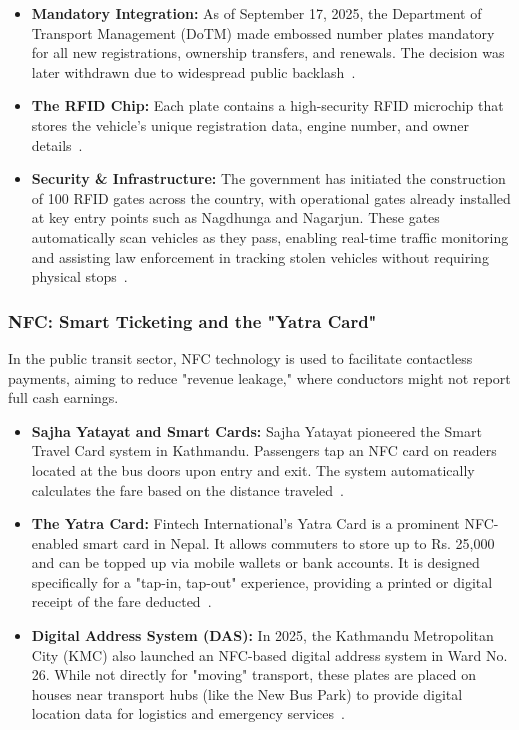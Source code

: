 \documentclass[sigconf, nonacm]{acmart}
\begin{document}
\begin{itemize}
    \item \textbf{Mandatory Integration:} As of September 17, 2025, the Department of Transport Management (DoTM) made embossed number plates mandatory for all new registrations, ownership transfers, and renewals. The decision was later withdrawn due to widespread public backlash~\cite{khatri2025embossed}.
    
    \item \textbf{The RFID Chip:} Each plate contains a high-security RFID microchip that stores the vehicle’s unique registration data, engine number, and owner details~\cite{omoda2025embossed}.
    
    \item \textbf{Security \& Infrastructure:} The government has initiated the construction of 100 RFID gates across the country, with operational gates already installed at key entry points such as Nagdhunga and Nagarjun. These gates automatically scan vehicles as they pass, enabling real-time traffic monitoring and assisting law enforcement in tracking stolen vehicles without requiring physical stops~\cite{khatri2025embossed}.
\end{itemize}


\subsubsection{NFC: Smart Ticketing and the "Yatra Card"}

In the public transit sector, NFC technology is used to facilitate contactless payments, aiming to reduce "revenue leakage," where conductors might not report full cash earnings.

\begin{itemize}
    \item \textbf{Sajha Yatayat and Smart Cards:}  Sajha Yatayat pioneered the Smart Travel Card system in Kathmandu. Passengers tap an NFC card on readers located at the bus doors upon entry and exit. The system automatically calculates the fare based on the distance traveled~\cite{shreya2025nepal}.
    
    \item \textbf{The Yatra Card:} Fintech International’s Yatra Card is a prominent NFC-enabled smart card in Nepal. It allows commuters to store up to Rs. 25,000 and can be topped up via mobile wallets or bank accounts. It is designed specifically for a "tap-in, tap-out" experience, providing a printed or digital receipt of the fare deducted~\cite{fintech2023yatra}.
    
    \item \textbf{Digital Address System (DAS):} In 2025, the Kathmandu Metropolitan City (KMC) also launched an NFC-based digital address system in Ward No. 26. While not directly for "moving" transport, these plates are placed on houses near transport hubs (like the New Bus Park) to provide digital location data for logistics and emergency services~\cite{bhatta2025kathmandu}.
\end{itemize}
\end{document}
